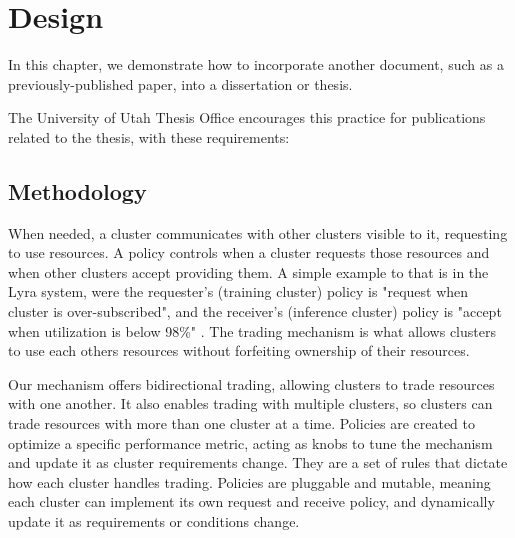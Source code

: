 
\chapter{Design}

In this chapter, we demonstrate how to incorporate another
document, such as a previously-published paper, into a
dissertation or thesis.

The University of Utah Thesis Office encourages this
practice for publications related to the thesis, with
these requirements:

\section{Methodology}
\vspace{1em}

\vspace{1em}
When needed, a cluster communicates with other clusters visible to it, requesting to use resources. A policy 
controls when a cluster requests those resources and when other clusters accept providing them. 
A simple example to that is in the Lyra system, were the requester's (training cluster) policy is "request 
when cluster is over-subscribed", and the receiver's (inference cluster) policy is "accept when 
utilization is below 98\%" \cite{li_lyra_2023}. The trading mechanism is what allows clusters to use each others 
resources without forfeiting ownership of their resources. 

Our mechanism offers bidirectional trading, allowing clusters to trade resources with one another. It also 
enables trading with multiple clusters, so clusters can trade resources with more than one cluster at a time. \label{sched-overhead} 
Policies are created to optimize a specific performance metric, acting as knobs to 
tune the mechanism and update it as cluster requirements change. They are a set of rules that dictate how each 
cluster handles trading. Policies are pluggable and mutable, meaning each cluster can implement its own request and receive 
policy, and dynamically update it as requirements or conditions change.

